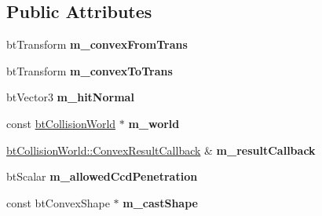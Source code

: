 \subsection*{Public Attributes}
\begin{DoxyCompactItemize}
\item 
\hypertarget{structbt_single_sweep_callback_a69b93f7fc3793e8984609295dc43346f}{bt\+Transform {\bfseries m\+\_\+convex\+From\+Trans}}\label{structbt_single_sweep_callback_a69b93f7fc3793e8984609295dc43346f}

\item 
\hypertarget{structbt_single_sweep_callback_a31ab25b89b90fa8157d51f504a677640}{bt\+Transform {\bfseries m\+\_\+convex\+To\+Trans}}\label{structbt_single_sweep_callback_a31ab25b89b90fa8157d51f504a677640}

\item 
\hypertarget{structbt_single_sweep_callback_a053037e4988f03348ce30f346bd60c64}{bt\+Vector3 {\bfseries m\+\_\+hit\+Normal}}\label{structbt_single_sweep_callback_a053037e4988f03348ce30f346bd60c64}

\item 
\hypertarget{structbt_single_sweep_callback_a38fbca89a6243c28912a6735437cea1f}{const \hyperlink{classbt_collision_world}{bt\+Collision\+World} $\ast$ {\bfseries m\+\_\+world}}\label{structbt_single_sweep_callback_a38fbca89a6243c28912a6735437cea1f}

\item 
\hypertarget{structbt_single_sweep_callback_abfbd3ec3f7292c7afaa86bd9429b2de5}{\hyperlink{structbt_collision_world_1_1_convex_result_callback}{bt\+Collision\+World\+::\+Convex\+Result\+Callback} \& {\bfseries m\+\_\+result\+Callback}}\label{structbt_single_sweep_callback_abfbd3ec3f7292c7afaa86bd9429b2de5}

\item 
\hypertarget{structbt_single_sweep_callback_ad4ed47b5940335cdf0b061a2d0226ef1}{bt\+Scalar {\bfseries m\+\_\+allowed\+Ccd\+Penetration}}\label{structbt_single_sweep_callback_ad4ed47b5940335cdf0b061a2d0226ef1}

\item 
\hypertarget{structbt_single_sweep_callback_a0bae8a399ab777f107a6b62e6ba0a85a}{const bt\+Convex\+Shape $\ast$ {\bfseries m\+\_\+cast\+Shape}}\label{structbt_single_sweep_callback_a0bae8a399ab777f107a6b62e6ba0a85a}

\end{DoxyCompactItemize}


